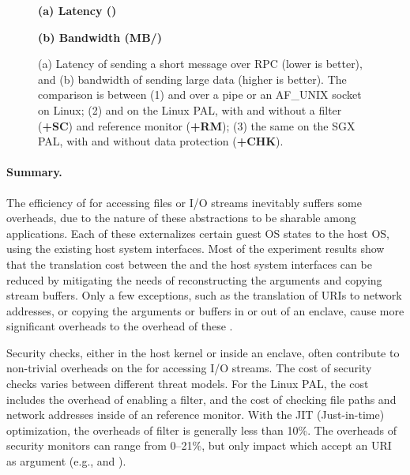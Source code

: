 \begin{figure*}[t!]
\centering
\footnotesize
{}
\parbox{0.30\textwidth}{\quad}
\parbox{0.34\textwidth}{\centering\bf (a) Latency ({\usec})}
\parbox{0.34\textwidth}{\centering\bf (b) Bandwidth (MB/\asec{})}
\caption{(a) Latency of sending a short message over RPC (lower is better), and (b) bandwidth of sending large data (higher is better).
The comparison is between (1)  and  over a pipe or an AF\_UNIX socket on Linux; (2)  and  on the Linux PAL, with and without a \seccomp{} filter ({\bf +SC}) and reference monitor ({\bf +RM}); (3) the same \hostapis{} on the SGX PAL, with and without data protection ({\bf +CHK}).}
\label{fig:eval:pal:pipe-latency-bandwidth}
\end{figure*}


\paragraph{Summary.}
The efficiency of \hostapis{} for accessing files or I/O streams
inevitably suffers some overheads,
due to the nature of these abstractions to be sharable
among applications.
Each of these \hostapis{} externalizes certain guest OS states
to the host OS,
using the existing host system interfaces.
Most of the experiment results
show that the translation cost between the \hostapis{} and the host system interfaces can be reduced
by mitigating the needs of reconstructing the \hostapi{} arguments
and copying stream buffers.
Only a few exceptions, such as the translation of URIs to network addresses,
or copying the arguments or buffers in or out of an enclave,
cause more significant overheads to the overhead of these \linuxapis{}.




Security checks, either in the host kernel or inside an enclave,
often contribute to
non-trivial overheads on the \hostapis{} for accessing I/O streams.
The cost of security checks
varies between different threat models.
For the Linux PAL, the cost includes the overhead of enabling a \seccomp{} filter, and the cost of checking file paths and network addresses
inside of an reference monitor.
With the JIT (Just-in-time) optimization,
the overheads of \seccomp{} filter is generally less than 10\%.
The overheads of security monitors can range from 0--21\%, but only impact \hostapis{} which accept an URI as argument (e.g.,  and ).

